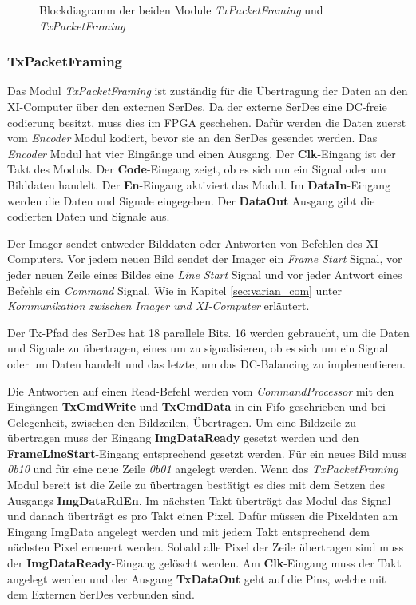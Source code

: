 \documentclass{article}
\begin{document}
\begin{figure}[tb]
    \caption{Blockdiagramm der beiden Module \textit{TxPacketFraming} und \textit{TxPacketFraming}}
    \label{fig:bd_fpga_varian}
\end{figure}

\subsubsection*{TxPacketFraming}
Das Modul \textit{TxPacketFraming} ist zuständig für die Übertragung der Daten an den XI-Computer über den externen SerDes. Da der externe SerDes eine DC-freie codierung besitzt, muss dies im FPGA geschehen. Dafür werden die Daten zuerst vom \textit{Encoder} Modul kodiert, bevor sie an den SerDes gesendet werden. Das \textit{Encoder} Modul hat vier Eingänge und einen Ausgang.
Der \textbf{Clk}-Eingang ist der Takt des Moduls.
Der \textbf{Code}-Eingang zeigt, ob es sich um ein Signal oder um Bilddaten handelt.
Der \textbf{En}-Eingang aktiviert das Modul.
Im \textbf{DataIn}-Eingang werden die Daten und Signale eingegeben.
Der \textbf{DataOut} Ausgang gibt die codierten Daten und Signale aus.

Der Imager sendet entweder Bilddaten oder Antworten von Befehlen des XI-Computers. Vor jedem neuen Bild sendet der Imager ein \textit{Frame Start} Signal, vor jeder neuen Zeile eines Bildes eine \textit{Line Start} Signal und vor jeder Antwort eines Befehls ein \textit{Command} Signal. Wie in Kapitel \ref{sec:varian_com} unter \textit{Kommunikation zwischen Imager und XI-Computer} erläutert.

Der Tx-Pfad des SerDes hat 18 parallele Bits. 16 werden gebraucht, um die Daten und Signale zu übertragen, eines um zu signalisieren, ob es sich um ein Signal oder um Daten handelt und das letzte, um das DC-Balancing zu implementieren.

Die Antworten auf einen Read-Befehl werden vom \textit{CommandProcessor} mit den Eingängen \textbf{TxCmdWrite} und \textbf{TxCmdData} in ein Fifo geschrieben und bei Gelegenheit, zwischen den Bildzeilen, Übertragen.
Um eine Bildzeile zu übertragen muss der Eingang \textbf{ImgDataReady} gesetzt werden und den \textbf{FrameLineStart}-Eingang entsprechend gesetzt werden. Für ein neues Bild muss \textit{0b10} und für eine neue Zeile \textit{0b01} angelegt werden. Wenn das \textit{TxPacketFraming} Modul bereit ist die Zeile zu übertragen bestätigt es dies mit dem Setzen des Ausgangs \textbf{ImgDataRdEn}. Im nächsten Takt überträgt das Modul das Signal und danach überträgt es pro Takt einen Pixel. Dafür müssen die Pixeldaten am Eingang {ImgData} angelegt werden und mit jedem Takt entsprechend dem nächsten Pixel erneuert werden. Sobald alle Pixel der Zeile übertragen sind muss der \textbf{ImgDataReady}-Eingang gelöscht werden. Am \textbf{Clk}-Eingang muss der Takt angelegt werden und der Ausgang \textbf{TxDataOut} geht auf die Pins, welche mit dem Externen SerDes verbunden sind.
\end{document}
